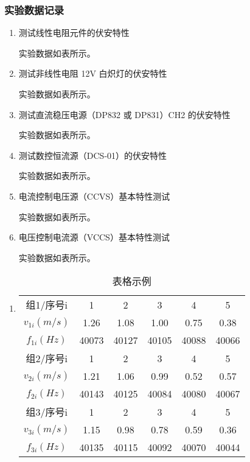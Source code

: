 \documentclass[dvipsnames, svgnames,a4paper,11pt]{article}
\begin{document}
	\subsubsection{实验数据记录}
	\begin{enumerate}
		\item 测试线性电阻元件的伏安特性
		
		实验数据如表所示。
		
		\item 测试非线性电阻 12V 白炽灯的伏安特性
		
		实验数据如表所示。
		
		\item 测试直流稳压电源（DP832 或 DP831）CH2 的伏安特性
		
		实验数据如表所示。
		
		\item 测试数控恒流源（DCS-01）的伏安特性
		
		实验数据如表所示。
		
		\item 电流控制电压源（CCVS）基本特性测试
		
		实验数据如表所示。
		
		\item 电压控制电流源（VCCS）基本特性测试
		
		实验数据如表所示。
	\end{enumerate}
	
	\begin{enumerate}
		\item \begin{table}[h]
			\centering
			\caption{表格示例}
			\label{tab:tab1}
			\begin{tabular}{|c|c|c|c|c|c|}
				\hline
				组1/序号i & 1 & 2 & 3 & 4 & 5 \\
				$v_{1i}(m/s)$ & 1.26 & 1.08 & 1.00 & 0.75 & 0.38 \\
				$f_{1i}(Hz)$ & 40073 & 40127 & 40105 & 40088 & 40066 \\
				\hline
				组2/序号i & 1 & 2 & 3 & 4 & 5 \\
				$v_{2i}(m/s)$ & 1.21 & 1.06 & 0.99 & 0.52 & 0.57 \\
				$f_{2i}(Hz)$ & 40143 & 40125 & 40084 & 40080 & 40067 \\
				\hline
				组3/序号i & 1 & 2 & 3 & 4 & 5 \\
				$v_{3i}(m/s)$ & 1.15 & 0.98 & 0.78 & 0.59 & 0.36 \\
				$f_{3i}(Hz)$ & 40135 & 40115 & 40092 & 40070 & 40044 \\
				\hline
			\end{tabular}
		\end{table}		
	\end{enumerate}
	
\end{document}
